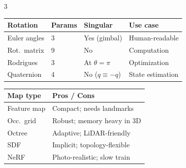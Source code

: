 \documentclass[9pt,landscape]{article}
\begin{document}
\begin{multicols}{3}
\begin{tabular}{@{}p{1.5cm}p{1.4cm}p{1.2cm}p{1.5cm}@{}}
\toprule
\textbf{Rotation} & \textbf{Params} & \textbf{Singular} & \textbf{Use case}\\
\midrule
Euler angles & 3 & Yes (gimbal) & Human-readable\\
Rot.\ matrix & 9 & No & Computation\\
Rodrigues & 3 & At $\theta=\pi$ & Optimization\\
Quaternion & 4 & No ($q\equiv-q$) & State estimation\\
\bottomrule
\end{tabular}

\vspace{4pt}
\begin{tabular}{@{}p{1.5cm}p{3.2cm}@{}}
\toprule
\textbf{Map type} & \textbf{Pros / Cons}\\
\midrule
Feature map & Compact; needs landmarks\\
Occ.\ grid & Robust; memory heavy in 3D\\
Octree & Adaptive; LiDAR-friendly\\
SDF & Implicit; topology-flexible\\
NeRF & Photo-realistic; slow train\\
\bottomrule
\end{tabular}

\end{multicols}
\end{document}
